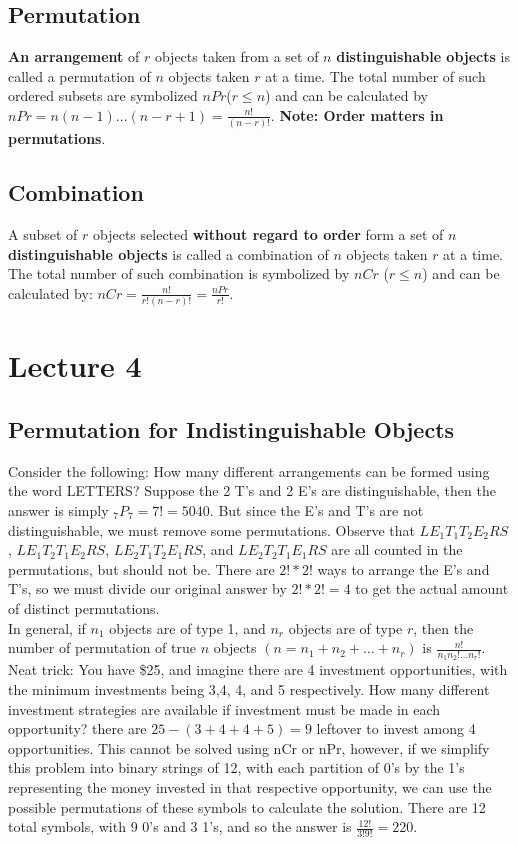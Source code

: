 \documentclass[10pt,letter]{article}
\begin{document}
\subsection*{Permutation} \textbf{An arrangement} of $r$ objects taken from a set of $n$ \textbf{distinguishable objects} is called a permutation of $n$ objects taken $r$ at a time. The total number of such ordered subsets are symbolized $nPr$($r\leq n$) and can be calculated by $nPr=n(n-1)\ldots(n-r+1)=\frac{n!}{(n-r)!}$. \textbf{Note: Order matters in permutations}. 

\subsection*{Combination} A subset of $r$ objects selected \textbf{without regard to order} form a set of $n$ \textbf{distinguishable objects} is called a combination of $n$ objects taken $r$ at a time. The total number of such combination is symbolized by $nCr$ ($r\leq n$) and can be calculated by: $nCr=\frac{n!}{r!(n-r)!}=\frac{nPr}{r!}$. 

\section*{Lecture 4}
\subsection*{Permutation for Indistinguishable Objects} Consider the following: How many different arrangements can be formed using the word LETTERS? Suppose the 2 T's and 2 E's are distinguishable, then the answer is simply $_7P_7=7!=5040$. But since the E's and T's are not distinguishable, we must remove some permutations. Observe that $LE_1T_1T_2E_2RS$, $LE_1T_2T_1E_2RS$, $LE_2T_1T_2E_1RS$, and $LE_2T_2T_1E_1RS$ are all counted in the permutations, but should not be. There are $2!*2!$ ways to arrange the E's and T's, so we must divide our original answer by $2!*2!=4$ to get the actual amount of distinct permutations. \\ 
In general, if $n_1$ objects are of type 1, and $n_r$ objects are of type $r$, then the number of permutation of true $n$ objects $(n=n_1+n_2+\ldots+n_r)$ is $\frac{n!}{n_1n_2!\ldots n_r!}$. \\ 
Neat trick: You have \$25, and imagine there are 4 investment opportunities, with the minimum investments being 3,4, 4, and 5 respectively. How many different investment strategies are available if investment must be made in each opportunity? there are $25-(3+4+4+5)=9$ leftover to invest among 4 opportunities. This cannot be solved using nCr or nPr, however, if we simplify this problem into binary strings of 12, with each partition of 0's by the 1's representing the money invested in that respective opportunity, we can use the possible permutations of these symbols to calculate the solution. There are 12 total symbols, with 9 0's and 3 1's, and so the answer is $\frac{12!}{3!9!}=220$. 
\end{document}
